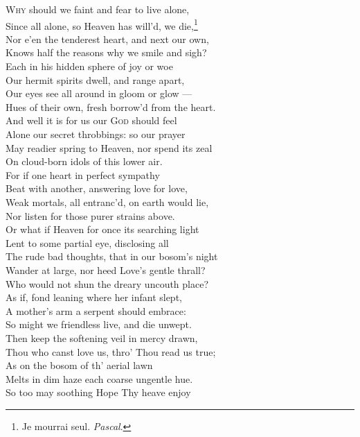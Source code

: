 \textsc{Why} should we faint and fear to live alone, \\
 Since all alone, so Heaven has will’d, we die,\footnote{Je mourrai seul. \emph{Pascal}.} \\
 Nor e’en the tenderest heart, and next our own, \\
 Knows half the reasons why we smile and sigh? \\
  Each in his hidden sphere of joy or woe \\
 Our hermit spirits dwell, and range apart, \\
 Our eyes see all around in gloom or glow — \\
 Hues of their own, fresh borrow’d from the heart. \\
  And well it is for us our \textsc{God} should feel \\
 Alone our secret throbbings: so our prayer \\
 May readier spring to Heaven, nor spend its zeal \\
 On cloud-born idols of this lower air. \\
  For if one heart in perfect sympathy \\
 Beat with another, answering love for love, \\
 Weak mortals, all entranc’d, on earth would lie, \\
 Nor listen for those purer strains above. \\
  Or what if Heaven for once its searching light \\
 Lent to some partial eye, disclosing all \\
 The rude bad thoughts, that in our bosom’s night \\
 Wander at large, nor heed Love’s gentle thrall? \\
  Who would not shun the dreary uncouth place? \\
 As if, fond leaning where her infant slept, \\
 A mother’s arm a serpent should embrace: \\
 So might we friendless live, and die unwept. \\
  Then keep the softening veil in mercy drawn, \\
 Thou who canst love us, thro’ Thou read us true; \\
 As on the bosom of th’ aerial lawn \\
 Melts in dim haze each coarse ungentle hue. \\
  So too may soothing Hope Thy heave enjoy \\
